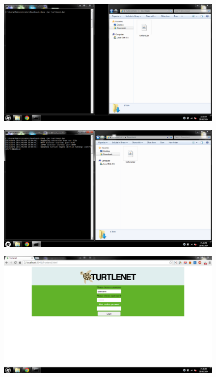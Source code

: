 \begin{figure}[h]
    \centering
    \includegraphics{images/screenshots/1startprogram.png}
\end{figure}

\begin{figure}[h]
    \centering
    \includegraphics{images/screenshots/2running.png}
\end{figure}

\begin{figure}[h]
    \centering
    \includegraphics{images/screenshots/4login.png}
\end{figure}

